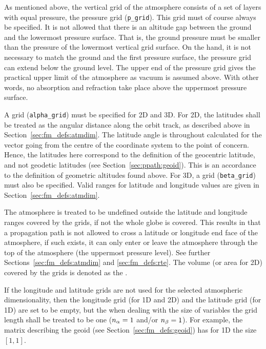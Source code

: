

\label{sec:fm_defs:grids}

As mentioned above, the vertical grid of the atmosphere consists of a
set of layers with equal pressure, the pressure grid (\verb|p_grid|).
This grid must of course always be specified. It is not allowed that
there is an altitude gap between the ground and the lowermost pressure
surface.  That is, the ground pressure must be smaller than the
pressure of the lowermost vertical grid surface. On the hand, it is
not necessary to match the ground and the first pressure surface, the
pressure grid can extend below the ground level. The upper end of the
pressure grid gives the practical upper limit of the atmosphere as
vacuum is assumed above. With other words, no absorption and
refraction take place above the uppermost pressure surface.

A  grid (\verb|alpha_grid|) must be specified for 2D and 3D.
For 2D, the latitudes shall be treated as the angular distance along
the orbit track, as described above in
Section~\ref{sec:fm_defs:atmdim}.  The latitude angle is throughout
calculated for the vector going from the centre of the coordinate
system to the point of concern. Hence, the latitudes here correspond
to the definition of the geocentric latitude, and not geodetic
latitudes (see Section~\ref{sec:ppath:geoid}). This is an accordance
to the definition of geometric altitudes found above. 
For 3D, a  grid (\verb|beta_grid|) must also be specified.
Valid ranges for latitude and longitude values are given in
Section~\ref{sec:fm_defs:atmdim}. 

The atmosphere is treated to be undefined outside the latitude and
longitude ranges covered by the grids, if not the whole globe is
covered. This results in that a propagation path is not allowed to
cross a latitude or longitude end face of the atmosphere, if such
exists, it can only enter or leave the atmosphere through the top of
the atmosphere (the uppermost pressure level). See further
Sections~\ref{sec:fm_defs:atmdim} and \ref{sec:fm_defs:rte}. The
volume (or area for 2D) covered by the grids is denoted as the
.

If the longitude and latitude grids are not used for the selected
atmospheric dimensionality, then the longitude grid (for 1D and 2D)
and the latitude grid (for 1D) are set to be empty, but the when
dealing with the size of variables the grid length shall be treated to
be one ($n_{\alpha}=1$ and/or $n_{\beta}=1$). For example,
the matrix describing the geoid (see Section~\ref{sec:fm_defs:geoid})
has for 1D the size $[1,1]$.

